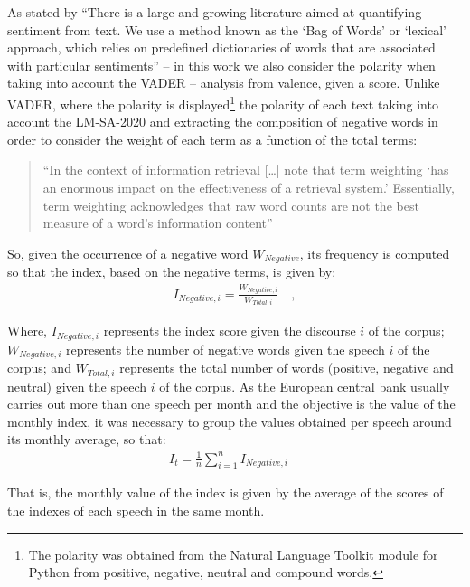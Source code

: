 As stated by \cite[p. 13]{shapiro2021taking} ``There is a large and growing literature aimed at quantifying sentiment from text. We use a method known as the `Bag of Words' or `lexical' approach, which relies on predefined dictionaries of words that are associated with particular sentiments'' -- in this work we also consider the polarity when taking into account the VADER -- analysis from valence, given a score. Unlike VADER, where the polarity is displayed\footnote{The polarity was obtained from the Natural Language Toolkit \cite[]{bird2009natural} module for Python from positive, negative, neutral and compound words.} the polarity of each text taking into account the LM-SA-2020 and extracting the composition of negative words in order to consider the weight of each term as a function of the total terms:

\begin{quote}
``In the context of information retrieval [\dots] note that term weighting `has an enormous impact on the effectiveness of a retrieval system.' Essentially, term weighting acknowledges that raw word counts are not the
best measure of a word’s information content''\cite[p. 42]{shapiro2020measuring}
\end{quote}

So, given the occurrence of a negative word $W_{Negative}$, its frequency is computed so that the index, based on the negative terms, is given by:
\begin{align*}
I_{Negative, i} = \frac{W_{Negative, i}}{W_{Total, i}} \quad ,
\end{align*}

Where, $I_{Negative, i}$ represents the index score given the discourse $i$ of the corpus; $W_{Negative, i}$ represents the number of negative words given the speech $i$ of the corpus; and $W_{Total, i}$ represents the total number of words (positive, negative and neutral) given the speech $i$ of the corpus. As the European central bank usually carries out more than one speech per month and the objective is the value of the monthly index, it was necessary to group the values obtained per speech around its monthly average, so that:
\begin{align*}
    I_{t} = \frac{1}{n}\sum_{i=1}^{n}I_{Negative,i} \quad
\end{align*}

That is, the monthly value of the index is given by the average of the scores of the indexes of each speech in the same month.\\


